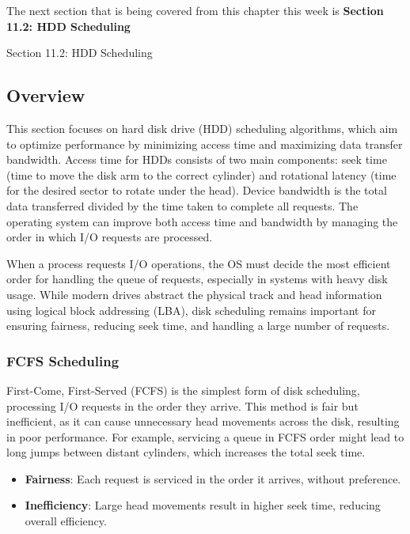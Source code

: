The next section that is being covered from this chapter this week is \textbf{Section 11.2: HDD Scheduling}

\begin{notes}{Section 11.2: HDD Scheduling}

    \subsection*{Overview}
    
    This section focuses on hard disk drive (HDD) scheduling algorithms, which aim to optimize performance by minimizing access time and maximizing data transfer bandwidth. Access time for HDDs consists 
    of two main components: seek time (time to move the disk arm to the correct cylinder) and rotational latency (time for the desired sector to rotate under the head). Device bandwidth is the total data 
    transferred divided by the time taken to complete all requests. The operating system can improve both access time and bandwidth by managing the order in which I/O requests are processed. 
    
    When a process requests I/O operations, the OS must decide the most efficient order for handling the queue of requests, especially in systems with heavy disk usage. While modern drives abstract the 
    physical track and head information using logical block addressing (LBA), disk scheduling remains important for ensuring fairness, reducing seek time, and handling a large number of requests.
    
    \subsubsection*{FCFS Scheduling}
    
    First-Come, First-Served (FCFS) is the simplest form of disk scheduling, processing I/O requests in the order they arrive. This method is fair but inefficient, as it can cause unnecessary head movements 
    across the disk, resulting in poor performance. For example, servicing a queue in FCFS order might lead to long jumps between distant cylinders, which increases the total seek time.
    
    \begin{highlight}
    
        \begin{itemize}
            \item \textbf{Fairness}: Each request is serviced in the order it arrives, without preference.
            \item \textbf{Inefficiency}: Large head movements result in higher seek time, reducing overall efficiency.
        \end{itemize}
    

\end{highlight}
\end{notes}
